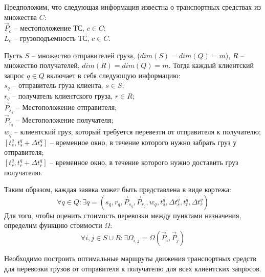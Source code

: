 \documentclass[]{TAACpaper}
\begin{document}
Предположим, что следующая информация известна о транспортных средствах из множества $C$: \\
$\vec{P}_c$ -- местоположение ТС, $c \in C$;\\
$L_c$ -- грузоподъемность ТС, $c \in C$.

Пусть $S$ -- множество отправителей груза, ($dim(S) = dim(Q) = m$), $R$ -- множество получателей, $dim(R) = dim(Q) = m$. Тогда каждый клиентский запрос $q \in Q$ включает в себя следующую информацию:\\
$s_q$ -- отправитель груза клиента, $s \in S$; \\
$r_q$ -- получатель клиентского груза, $r \in R$; \\
$\vec{P}_{s_q}$ -- Местоположение отправителя;\\
$\vec{P}_{r_q}$ -- Местоположение получателя; \\
$w_q$ -- клиентский груз, который требуется перевезти от отправителя к получателю; \\
$[t_{s}^{q}, t_{s}^{q}+ \Delta{t_{s}^{q}}]$ -- временное окно, в течение которого нужно забрать груз у отправителя;\\ 
$[t_{r}^{q}, t_{r}^{q}+ \Delta{t_{r}^{q}}]$ -- временное окно, в течение которого нужно доставить груз получателю.
 
Таким образом, каждая заявка может быть представлена в виде кортежа:
\begin{equation}
\forall q \in Q: \exists q = (s_q,r_q, \vec{P}_{s_q}, \vec{P}_{r_q}, w_q, t_{s}^{q}, \Delta{t_{s}^{q}}, t_{r}^{q}, \Delta{t_{r}^{q}})
\end{equation}
Для того, чтобы оценить стоимость перевозки между пунктами назначения, определим функцию стоимости $\Omega$:
\begin{equation}
\forall i,j \in S \cup R: \exists \Omega_{i,j} = \Omega(\vec{P}_i,\vec{P}_j)
\end{equation}

Необходимо построить оптимальные маршруты движения транспортных средств для перевозки грузов от отправителя к получателю для всех клиентских запросов.
\end{document}
